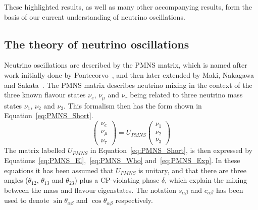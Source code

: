 These highlighted results, as well as many other accompanying results, form the basis of our current understanding of neutrino oscillations. \\

\subsection{The theory of neutrino oscillations} \label{Neut_Oscil}
Neutrino oscillations are described by the PMNS matrix, which is named after work initially done by Pontecorvo~\citep{Pontecorvo1957}, and then later extended by Maki, Nakagawa and Sakata~\citep{PMNS}. The PMNS matrix describes neutrino mixing in the context of the three known flavour states $\nu_e$, $\nu_\mu$ and $\nu_\tau$ being related to three neutrino mass states $\nu_1$, $\nu_2$ and $\nu_3$. This formalism then has the form shown in Equation~\ref{eq:PMNS_Short}.
\begin{equation}
  \label{eq:PMNS_Short}
  \begin{pmatrix} \nu_e \\ \nu_\mu \\ \nu_\tau \end{pmatrix} = U_{PMNS} \begin{pmatrix} \nu_1 \\ \nu_2 \\ \nu_3 \end{pmatrix}
\end{equation}
The matrix labelled $U_{PMNS}$ in Equation~\ref{eq:PMNS_Short}, is then expressed by Equations~\ref{eq:PMNS_El},~\ref{eq:PMNS_Who} and~\ref{eq:PMNS_Exp}. In these equations it has been assumed that $U_{PMNS}$ is unitary, and that there are three angles ($\theta_{12}$, $\theta_{13}$ and $\theta_{23}$) plus a CP-violating phase $\delta$, which explain the mixing between the mass and flavour eigenstates. The notation $s_{\alpha\beta}$ and $c_{\alpha\beta}$ has been used to denote $\sin\theta_{\alpha\beta}$ and $\cos\theta_{\alpha\beta}$ respectively. \\
